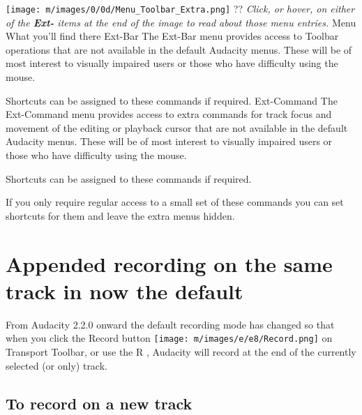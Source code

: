 


\texttt{[image: m/images/0/0d/Menu\_Toolbar\_Extra.png]}
??
\textit{Click, or hover, on either of the \textbf{Ext-} items at the end of the image to read about those menu entries.}
Menu
What you'll find there
Ext-Bar
The Ext-Bar menu provides access to Toolbar operations that are not available in the default Audacity menus. These will be of most interest to visually impaired users or those who have difficulty using the mouse.

Shortcuts can be assigned to these commands if required.
Ext-Command
The Ext-Command menu provides access to extra commands for track focus and movement of the editing or playback cursor that are not available in the default Audacity menus. These will be of most interest to visually impaired users or those who have difficulty using the mouse.

Shortcuts can be assigned to these commands if required.

If you only require regular access to a small set of these commands you can set shortcuts for them and leave the extra menus hidden.





\section{
Appended recording on the same track in now the default
}


From Audacity 2.2.0 onward the default recording mode has changed so that when you click the Record button \texttt{[image: m/images/e/e8/Record.png]} on Transport Toolbar, or use the 
R
, Audacity will record at the end of the currently selected (or only) track.

\subsection{
To record on a new track
}


